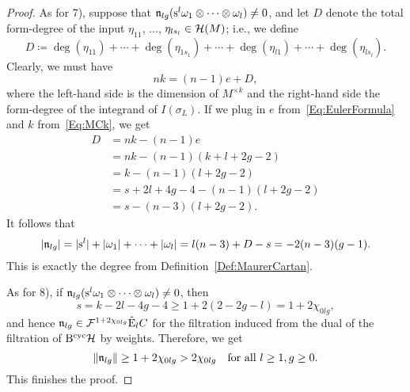 \documentclass[\MainFolder/Text.tex]{subfiles}
\begin{document}
\begin{proof}
As for 7), suppose that $\mathfrak{n}_{lg}(\mathrm{s}^l \omega_1 \otimes \dotsb \otimes \omega_l) \neq 0$, and let $D$ denote the total form-degree of the input $\eta_{11}$, $\dotsc$, $\eta_{l s_l}\in \mathcal{H}(M)$; i.e., we define
\begin{equation*}
 D \coloneqq \deg(\eta_{11}) + \dotsb + \deg(\eta_{1s_1}) + \dotsb + \deg(\eta_{l 1}) + \dotsb + \deg(\eta_{l s_l}).
\end{equation*}
Clearly, we must have
\begin{equation}  \label{Eq:TotDeg}
nk = (n-1) e  + D, 
\end{equation}
where the left-hand side is the dimension of $M^{\times k}$ and the right-hand side the form-degree of the integrand of $I(\sigma_L)$. If we plug in $e$ from~\eqref{Eq:EulerFormula} and $k$ from~\eqref{Eq:MCk}, we get
$$ \begin{aligned} D &= nk - (n-1) e \\ 
   &= nk - (n-1)(k+l+2g-2) \\
   & = k - (n-1)(l+2g-2) \\
   & = s + 2l +4g - 4 - (n-1)(l+2g-2) \\
   & = s - (n-3)(l+2g-2). \end{aligned}$$
It follows that
$$ |\mathfrak{n}_{lg}| = |\mathrm{s}^l| + |\omega_1| +  \dotsb + |\omega_l| =  l(n-3) + D - s = - 2(n-3)(g-1). $$
This is exactly the degree from Definition~\ref{Def:MaurerCartan}. 

As for 8), if $\mathfrak{n}_{lg}(\mathrm{s}^l \omega_1 \otimes \dotsb\otimes \omega_l)\neq 0$, then
$$ s = k - 2l -4g -4 \ge 1 + 2(2-2g-l) = 1 + 2 \chi_{0lg}, $$
and hence $\mathfrak{n}_{lg}\in \mathcal{F}^{1+2\chi_{0lg}}\hat{\mathrm{E}}_l C$ for the filtration induced from the dual of the filtration of $\mathrm{B}^{\mathrm{cyc}} \mathcal{H}$ by weights. Therefore, we get 
$$ \|\mathfrak{n}_{lg}\| \ge 1 + 2\chi_{0lg} > 2\chi_{0lg} \quad\text{for all }l\ge 1, g\ge 0. $$
This finishes the proof.
\end{proof}

\end{document}
